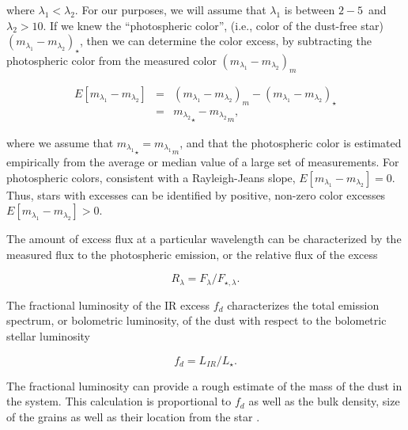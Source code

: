     \noindent where $\lambda_1<\lambda_2$. For our purposes, we will assume that $\lambda_1$ is between $2-5$\micron\ and $\lambda_2>10$\micron. If we knew the ``photospheric color'', (i.e., color of the dust-free star) ${\left(m_{\lambda_1} - m_{\lambda_2}\right)}_\star$, then we can determine the color excess, by subtracting the photospheric color from the measured color ${\left(m_{\lambda_1} - m_{\lambda_2}\right)}_m$
    
    \begin{eqnarray}\label{eq:color_excess}
    E\left[m_{\lambda_1} - m_{\lambda_2}\right] &=& {\left(m_{\lambda_1} - m_{\lambda_2}\right)}_m - {\left(m_{\lambda_1} - m_{\lambda_2}\right)}_\star \\ 
    &=& {m_{\lambda_2}}_\star - {m_{\lambda_2}}_m,
    \end{eqnarray}
    
    \noindent where we assume that ${m_{\lambda_1}}_\star = {m_{\lambda_1}}_m$, and that the photospheric color is estimated empirically from the average or median value of a large set of measurements. For photospheric colors, consistent with a Rayleigh-Jeans slope, $E\left[m_{\lambda_1} - m_{\lambda_2}\right]=0$. Thus, stars with excesses can be identified by positive, non-zero color excesses $E\left[m_{\lambda_1} - m_{\lambda_2}\right]>0$. 
        
        The amount of excess flux at a particular wavelength can be characterized by the measured flux to the photospheric emission, or the relative flux of the excess
        
        \begin{equation}\label{eq:rel_excess}
        R_\lambda = F_\lambda / F_{\star,\lambda}.
        \end{equation}
        
        \noindent The fractional luminosity of the IR excess $f_d$ characterizes the total emission spectrum, or bolometric luminosity, of the dust with respect to the bolometric stellar luminosity
        
        \begin{equation}\label{eq:fd}
        f_d = L_{IR}/L_{\star}.
        \end{equation}
        
        \noindent The fractional luminosity can provide a rough estimate of the mass of the dust in the system. This calculation is proportional to $f_d$ as well as the bulk density, size of the grains as well as their location from the star \citep{Beckwith2000}. 
        
